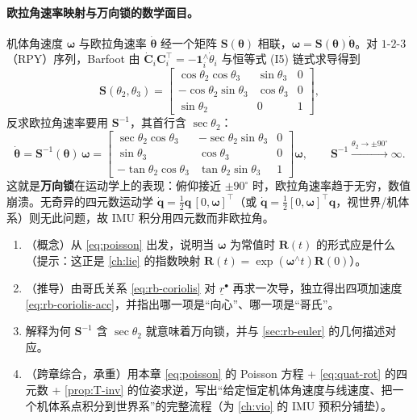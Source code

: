 \paragraph{欧拉角速率映射与万向锁的数学面目。}机体角速度 $\boldsymbol{\omega}$ 与欧拉角速率 $\dot{\boldsymbol{\theta}}$ 经一个矩阵 $\mathbf{S}(\boldsymbol{\theta})$ 相联，$\boldsymbol{\omega}=\mathbf{S}(\boldsymbol{\theta})\dot{\boldsymbol{\theta}}$。对 $1$-$2$-$3$（RPY）序列，Barfoot 由 $\dot{\mathbf{C}}_i\mathbf{C}_i^\top=-\mathbf{1}_i^\wedge\dot{\theta}_i$ 与恒等式 (I5) 链式求导得到\cite{barfoot2024state}
\begin{equation}
  \mathbf{S}(\theta_2,\theta_3)=\begin{bmatrix}\cos\theta_2\cos\theta_3&\sin\theta_3&0\\-\cos\theta_2\sin\theta_3&\cos\theta_3&0\\\sin\theta_2&0&1\end{bmatrix},
\end{equation}
反求欧拉角速率要用 $\mathbf{S}^{-1}$，其首行含 $\sec\theta_2$：
\begin{equation}
  \dot{\boldsymbol{\theta}}=\mathbf{S}^{-1}(\boldsymbol{\theta})\,\boldsymbol{\omega}
  =\begin{bmatrix}\sec\theta_2\cos\theta_3&-\sec\theta_2\sin\theta_3&0\\\sin\theta_3&\cos\theta_3&0\\-\tan\theta_2\cos\theta_3&\tan\theta_2\sin\theta_3&1\end{bmatrix}\boldsymbol{\omega},
  \qquad \mathbf{S}^{-1}\xrightarrow{\theta_2\to\pm90^\circ}\infty.
  \label{eq:rb-eulerrate}
\end{equation}
这就是\textbf{万向锁}在运动学上的表现：俯仰接近 $\pm90^\circ$ 时，欧拉角速率趋于无穷，数值崩溃。无奇异的四元数运动学 $\dot{\mathbf{q}}=\tfrac12\mathbf{q}\,[0,\boldsymbol{\omega}]^\top$（或 $\dot{\mathbf{q}}=\tfrac12[0,\boldsymbol{\omega}]^\top\mathbf{q}$，视世界/机体系）则无此问题，故 IMU 积分用四元数而非欧拉角。

\begin{practice}
\begin{enumerate}
  \item （概念）从 \cref{eq:poisson} 出发，说明当 $\boldsymbol{\omega}$ 为常值时 $\mathbf{R}(t)$ 的形式应是什么（提示：这正是 \cref{ch:lie} 的指数映射 $\mathbf{R}(t)=\exp(\boldsymbol{\omega}^\wedge t)\mathbf{R}(0)$）。
  \item （推导）由哥氏关系 \cref{eq:rb-coriolis} 对 $\underline{r}^{\bullet}$ 再求一次导，独立得出四项加速度 \cref{eq:rb-coriolis-acc}，并指出哪一项是“向心”、哪一项是“哥氏”。
  \item 解释为何 $\mathbf{S}^{-1}$ 含 $\sec\theta_2$ 就意味着万向锁，并与 \cref{sec:rb-euler} 的几何描述对应。
  \item （跨章综合，承重）用本章 \cref{eq:poisson} 的 Poisson 方程 + \cref{eq:quat-rot} 的四元数 + \cref{prop:T-inv} 的位姿求逆，写出“给定恒定机体角速度与线速度、把一个机体系点积分到世界系”的完整流程（为 \cref{ch:vio} 的 IMU 预积分铺垫）。
\end{enumerate}
\end{practice}

